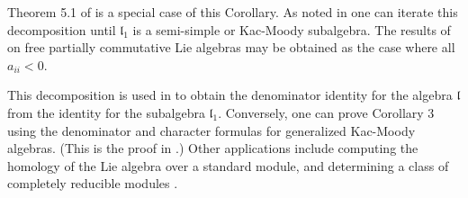 \documentclass[11pt]{amsart}
\theoremstyle{definition}
\renewcommand{\frak}{\mathfrak}
\begin{document}
Theorem 5.1 of \cite{6} is a special case of this Corollary. As noted in 
\cite{7} one can iterate this decomposition until $\frak l_1$ is a 
semi-simple or Kac-Moody subalgebra. The results of 
\cite{5} on free partially commutative Lie algebras may be obtained as the case 
where all $a_{ii}<0$. 

This decomposition is used in \cite{6} to obtain the denominator
identity for the algebra $\frak l$ {}from the identity for the
subalgebra $\frak l_1$. Conversely, one can prove Corollary 3 using the
denominator and character formulas for generalized Kac-Moody algebras.
(This is the proof in \cite{7}.) Other applications include computing
the homology of the Lie algebra over a standard module, and
determining a class of completely reducible modules \cite{8}.


\end{document}
